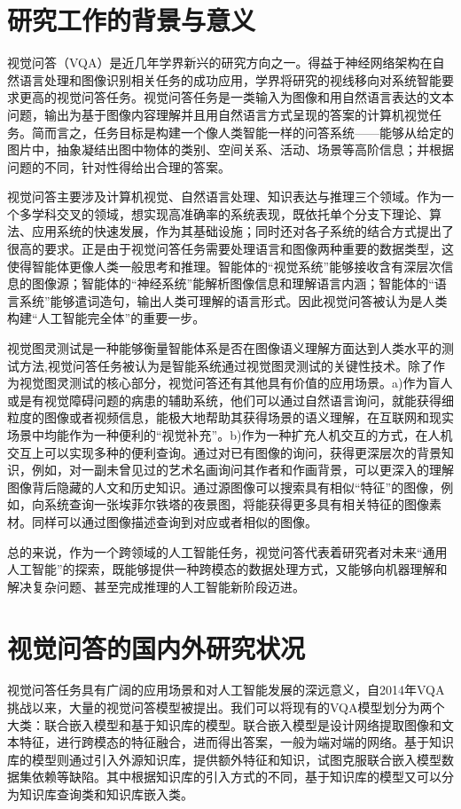 \thesischapterexordium

\section{研究工作的背景与意义}

视觉问答（VQA）是近几年学界新兴的研究方向之一。得益于神经网络架构在自然语言处理和图像识别相关任务的成功应用，学界将研究的视线移向对系统智能要求更高的视觉问答任务。视觉问答任务是一类输入为图像和用自然语言表达的文本问题，输出为基于图像内容理解并且用自然语言方式呈现的答案的计算机视觉任务。简而言之，任务目标是构建一个像人类智能一样的问答系统——能够从给定的图片中，抽象凝结出图中物体的类别、空间关系、活动、场景等高阶信息；并根据问题的不同，针对性得给出合理的答案。

视觉问答主要涉及计算机视觉、自然语言处理、知识表达与推理三个领域。作为一个多学科交叉的领域，想实现高准确率的系统表现，既依托单个分支下理论、算法、应用系统的快速发展，作为其基础设施；同时还对各子系统的结合方式提出了很高的要求。正是由于视觉问答任务需要处理语言和图像两种重要的数据类型，这使得智能体更像人类一般思考和推理。智能体的“视觉系统”能够接收含有深层次信息的图像源；智能体的“神经系统”能解析图像信息和理解语言内涵；智能体的“语言系统”能够遣词造句，输出人类可理解的语言形式。因此视觉问答被认为是人类构建“人工智能完全体”的重要一步。

视觉图灵测试是一种能够衡量智能体系是否在图像语义理解方面达到人类水平的测试方法,视觉问答任务被认为是智能系统通过视觉图灵测试的关键性技术。除了作为视觉图灵测试的核心部分，视觉问答还有其他具有价值的应用场景。a)作为盲人或是有视觉障碍问题的病患的辅助系统，他们可以通过自然语言询问，就能获得细粒度的图像或者视频信息，能极大地帮助其获得场景的语义理解，在互联网和现实场景中均能作为一种便利的“视觉补充”。b)作为一种扩充人机交互的方式，在人机交互上可以实现多种的便利查询。通过对已有图像的询问，获得更深层次的背景知识，例如，对一副未曾见过的艺术名画询问其作者和作画背景，可以更深入的理解图像背后隐藏的人文和历史知识。通过源图像可以搜索具有相似“特征”的图像，例如，向系统查询一张埃菲尔铁塔的夜景图，将能获得更多具有相关特征的图像素材。同样可以通过图像描述查询到对应或者相似的图像。

总的来说，作为一个跨领域的人工智能任务，视觉问答代表着研究者对未来“通用人工智能”的探索，既能够提供一种跨模态的数据处理方式，又能够向机器理解和解决复杂问题、甚至完成推理的人工智能新阶段迈进。


\section{视觉问答的国内外研究状况}
视觉问答任务具有广阔的应用场景和对人工智能发展的深远意义，自2014年VQA挑战以来，大量的视觉问答模型被提出。我们可以将现有的VQA模型划分为两个大类：联合嵌入模型和基于知识库的模型。联合嵌入模型是设计网络提取图像和文本特征，进行跨模态的特征融合，进而得出答案，一般为端对端的网络。基于知识库的模型则通过引入外源知识库，提供额外特征和知识，试图克服联合嵌入模型数据集依赖等缺陷。其中根据知识库的引入方式的不同，基于知识库的模型又可以分为知识库查询类和知识库嵌入类。


